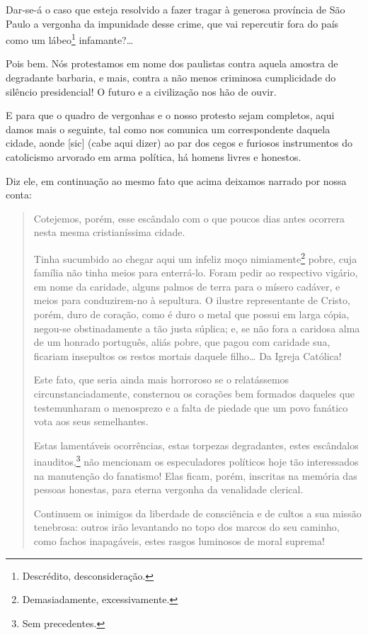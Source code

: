 Dar-se-á o caso que esteja resolvido a fazer tragar à generosa província
de São Paulo a vergonha da impunidade desse crime, que vai repercutir
fora do país como um lábeo\footnote{Descrédito, desconsideração.}
infamante?\ldots{}

Pois bem. Nós protestamos em nome dos paulistas contra aquela amostra de
degradante barbaria, e mais, contra a não menos criminosa cumplicidade
do silêncio presidencial! O futuro e a civilização nos hão de ouvir.

E para que o quadro de vergonhas e o nosso protesto sejam completos,
aqui damos mais o seguinte, tal como nos comunica um correspondente
daquela cidade, aonde {[}sic{]} (cabe aqui dizer) ao par dos cegos e
furiosos instrumentos do catolicismo arvorado em arma política, há
homens livres e honestos.

Diz ele, em continuação ao mesmo fato que acima deixamos narrado por
nossa conta:

\begin{quote}
Cotejemos, porém, esse escândalo com o que poucos dias antes ocorrera
nesta mesma cristianíssima cidade.

Tinha sucumbido ao chegar aqui um infeliz moço nimiamente\footnote{Demasiadamente,
  excessivamente.} pobre, cuja família não tinha meios para enterrá-lo.
Foram pedir ao respectivo vigário, em nome da caridade, alguns palmos de
terra para o mísero cadáver, e meios para conduzirem-no à sepultura. O
ilustre representante de Cristo, porém, duro de coração, como é duro o
metal que possui em larga cópia, negou-se obstinadamente a tão justa
súplica; e, se não fora a caridosa alma de um honrado português, aliás
pobre, que pagou com caridade sua, ficariam insepultos os restos mortais
daquele filho\ldots{} Da Igreja Católica!

Este fato, que seria ainda mais horroroso se o relatássemos
circunstanciadamente, consternou os corações bem formados daqueles que
testemunharam o menosprezo e a falta de piedade que um povo fanático
vota aos seus semelhantes.

Estas lamentáveis ocorrências, estas torpezas degradantes, estes
escândalos inauditos,\footnote{Sem precedentes.} não mencionam os
especuladores políticos hoje tão interessados na manutenção do
fanatismo! Elas ficam, porém, inscritas na memória das pessoas honestas,
para eterna vergonha da venalidade clerical.

Continuem os inimigos da liberdade de consciência e de cultos a sua
missão tenebrosa: outros irão levantando no topo dos marcos do seu
caminho, como fachos inapagáveis, estes rasgos luminosos de moral
suprema!
\end{quote}

